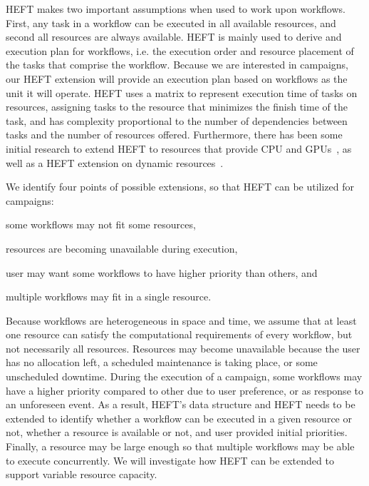 HEFT makes two important assumptions when used to work upon workflows.
First, any task in a workflow can be executed in all available resources, and second all resources are always available.
HEFT is mainly used to derive and execution plan for workflows, i.e. the execution order and resource placement of the tasks that comprise the workflow.
Because we are interested in campaigns, our HEFT extension will provide an execution plan based on workflows as the unit it will operate.
HEFT uses a matrix to represent execution time of tasks on resources, assigning tasks to the resource that minimizes the finish time of the task, and has complexity proportional to the number of dependencies between tasks and the number of resources offered.
Furthermore, there has been some initial research to extend HEFT to resources that provide CPU and GPUs~\cite{shetti2013optimization}, as well as a HEFT extension on dynamic resources~\cite{dong2007pfas}.

We identify four points of possible extensions, so that HEFT can be utilized for campaigns:
\begin{inparaenum}[(i)]
    \item some workflows may not fit some resources,
    \item resources are becoming unavailable during execution,
    \item user may want some workflows to have higher priority than others, and
    \item multiple workflows may fit in a single resource.
\end{inparaenum}
Because workflows are heterogeneous in space and time, we assume that at least one resource can satisfy the computational requirements of every workflow, but not necessarily all resources.
Resources may become unavailable because the user has no allocation left, a scheduled maintenance is taking place, or some unscheduled downtime.
During the execution of a campaign, some workflows may have a higher priority compared to other due to user preference, or as response to an unforeseen event.
As a result, HEFT's data structure and HEFT needs to be extended to identify whether a workflow can be executed in a given resource or not, whether a resource is available or not, and user provided initial priorities.
Finally, a resource may be large enough so that multiple workflows may be able to execute concurrently.
We will investigate how HEFT can be extended to support variable resource capacity.

